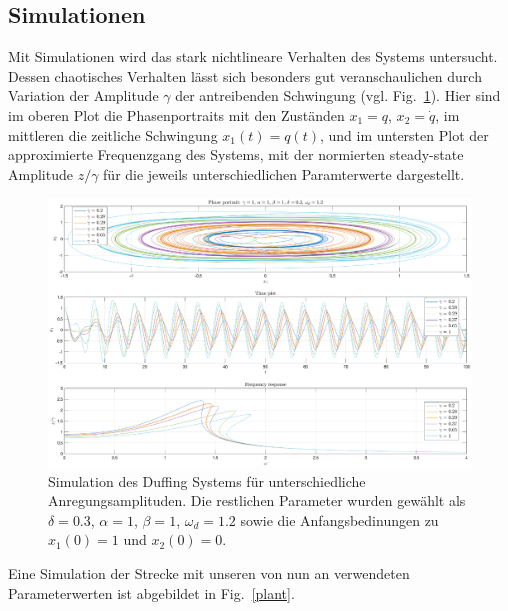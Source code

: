 \documentclass[paper=a4, fontsize=11pt]{scrartcl} %
\numberwithin{equation}{section} %
\numberwithin{figure}{section} %
\numberwithin{table}{section} %
\begin{document}
\subsection{Simulationen}

Mit Simulationen wird das stark nichtlineare Verhalten des Systems untersucht.
Dessen chaotisches Verhalten lässt sich besonders gut veranschaulichen durch Variation der Amplitude $\gamma$ der antreibenden Schwingung (vgl. Fig.~\ref{gammas}). Hier sind im oberen Plot die Phasenportraits mit den Zuständen $x_1=q$, $x_2=\dot{q}$, im mittleren die zeitliche Schwingung $x_1(t)=q(t)$, und im untersten Plot der approximierte Frequenzgang des Systems, mit der normierten steady-state Amplitude $z/\gamma$ für die jeweils unterschiedlichen Paramterwerte dargestellt.

\begin{figure}[!h]
	\centering
		\includegraphics[width=1\textwidth]{./gammas.eps}
	\caption{Simulation des Duffing Systems für unterschiedliche Anregungsamplituden. Die restlichen Parameter wurden gewählt als $\delta=0.3$, $\alpha=1$, $\beta=1$, $\omega_d=1.2$ sowie die Anfangsbedinungen zu $x_1(0)=1$ und $x_2(0)=0$.}
	\label{gammas}
\end{figure}

Eine Simulation der Strecke mit unseren von nun an verwendeten Parameterwerten ist abgebildet in Fig.~\ref{plant}.
\end{document}
